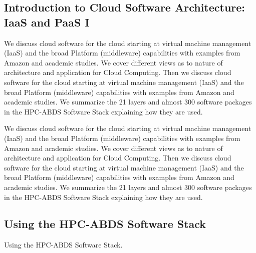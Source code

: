 \subsection{Introduction to Cloud Software Architecture: IaaS and  PaaS I}

We discuss cloud software for the cloud starting at virtual machine
management (IaaS) and the broad Platform (middleware) capabilities with
examples from Amazon and academic studies. We cover different views as
to nature of architecture and application for Cloud Computing. Then we
discuss cloud software for the cloud starting at virtual machine
management (IaaS) and the broad Platform (middleware) capabilities with
examples from Amazon and academic studies. We summarize the 21 layers
and almost 300 software packages in the HPC-ABDS Software Stack
explaining how they are used.




We discuss cloud software for the cloud starting at virtual machine
management (IaaS) and the broad Platform (middleware) capabilities with
examples from Amazon and academic studies. We cover different views as
to nature of architecture and application for Cloud Computing. Then we
discuss cloud software for the cloud starting at virtual machine
management (IaaS) and the broad Platform (middleware) capabilities with
examples from Amazon and academic studies. We summarize the 21 layers
and almost 300 software packages in the HPC-ABDS Software Stack
explaining how they are used.






\subsection{Using the HPC-ABDS Software Stack}

Using the HPC-ABDS Software Stack.



